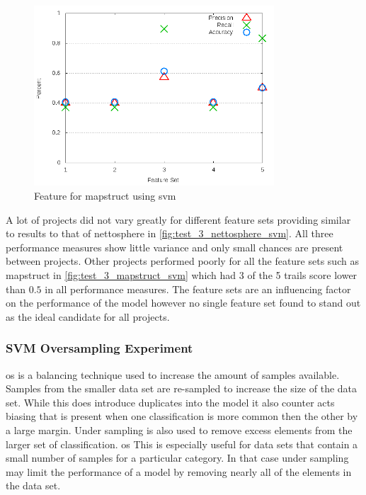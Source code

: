 \begin{figure}[!ht]
    \centering
        \includegraphics[width=0.8\textwidth]{images/svm/test_3/mapstruct_sample_range}
        \caption{Feature for mapstruct using \gls{svm}}
        \label{fig:test_3_mapstruct_svm}
\end{figure}

A lot of projects did not vary greatly for different feature sets providing similar to results to that of nettosphere in \autoref{fig:test_3_nettosphere_svm}. All three performance measures show little variance and only small chances are present between projects. Other projects performed poorly for all the feature sets such as mapstruct in \autoref{fig:test_3_mapstruct_svm} which had 3 of the 5 trails score lower than $0.5$ in all performance measures. The feature sets are an influencing factor on the performance of the model however no single feature set found to stand out as the ideal candidate for all projects.

\subsubsection{SVM Oversampling Experiment}
\label{sec:svm_os_experiment}


\gls{os} is a balancing technique used to increase the amount of samples available. Samples from the smaller data set are re-sampled to increase the size of the data set. While this does introduce duplicates into the model it also counter acts biasing that is present when one classification is more common then the other by a large margin. Under sampling is also used to remove excess elements from the larger set of classification. \gls{os} This is especially useful for data sets that contain a small number of samples for a particular category. In that case under sampling may limit the performance of a model by removing nearly all of the elements in the data set.

